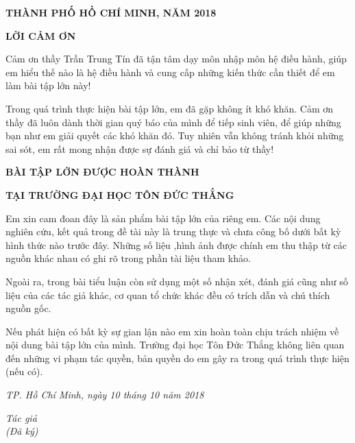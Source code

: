 \documentclass{report}
\begin{document}
\vspace{1cm}
\changefontsizes{14pt}
\centerline{\textbf{THÀNH PHỐ HỒ CHÍ MINH, NĂM 2018}}


\newpage
\changefontsizes{16pt}
\centerline{\textbf{LỜI CẢM ƠN}}

\changefontsizes{13pt}
\bigskip
\setlength{\parindent}{2cm}

Cảm ơn thầy Trần Trung Tín đã tận tâm dạy môn nhập môn hệ điều hành, giúp em hiểu thế nào là hệ điều hành và cung cấp những kiến thức cần thiết để em làm bài tập lớn này!

Trong quá trình thực hiện bài tập lớn, em đã gặp không ít khó khăn. Cảm ơn thầy đã luôn dành thời gian quý báo của mình để tiếp sinh viên, để giúp những bạn như em giải quyết các khó khăn đó. Tuy nhiên vẫn không tránh khỏi những sai sót, em rất mong nhận được sự đánh giá và chỉ bảo từ thầy!
    
\newpage
\changefontsizes{16pt}
\centerline{\textbf{BÀI TẬP LỚN ĐƯỢC HOÀN THÀNH}}
\centerline{\textbf{TẠI TRƯỜNG ĐẠI HỌC TÔN ĐỨC THẮNG}}
\changefontsizes{13pt}
\vspace{1cm}
\setlength{\parindent}{2cm}
Em xin cam đoan đây là sản phẩm bài tập lớn của riêng em. Các nội dung nghiên cứu, kết quả trong đề tài này là trung thực và chưa công bố dưới bất kỳ hình thức nào trước đây. Những số liệu ,hình ảnh được chính em thu thập từ các nguồn khác nhau có ghi rõ trong phần tài liệu tham khảo.

\setlength{\parindent}{2cm}
Ngoài ra, trong bài tiểu luận còn sử dụng một số nhận xét, đánh giá cũng như số liệu của các tác giả khác, cơ quan tổ chức khác đều có trích dẫn và chú thích nguồn gốc.

\setlength{\parindent}{2cm}
Nếu phát hiện có bất kỳ sự gian lận nào em xin hoàn toàn chịu trách nhiệm về nội dung bài tập lớn của mình. Trường đại học Tôn Đức Thắng không liên quan đến những vi phạm tác quyền, bản quyền do em gây ra trong quá trình thực hiện (nếu có).

\vspace{0.75cm}
\begin{flushright}
\renewcommand{\baselinestretch}{0.05}
\changefontsizes{13pt}
\textit{TP. Hồ Chí Minh, ngày 10 tháng 10 năm 2018}
\end{flushright}

\setlength{\parindent}{13cm}
\textit{Tác giả }\\

\setlength{\parindent}{13cm}
\textit{(Đã ký)}\\
\end{document}
